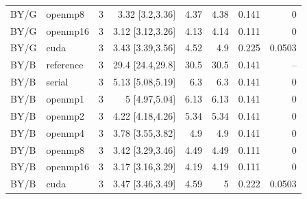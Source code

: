 \documentclass[11pt]{article}
\begin{document}
\begin{longtable}{llrrrrrr}
BY/G & openmp8 & 3 & 3.32 [3.2,3.36] & 4.37 & 4.38 & 0.141 & 0\\
BY/G & openmp16 & 3 & 3.12 [3.12,3.26] & 4.13 & 4.14 & 0.111 & 0\\
BY/G & cuda & 3 & 3.43 [3.39,3.56] & 4.52 & 4.9 & 0.225 & 0.0503\\
BY/B & reference & 3 & 29.4 [24.4,29.8] & 30.5 & 30.5 & 0.141 & --\\
BY/B & serial & 3 & 5.13 [5.08,5.19] & 6.3 & 6.3 & 0.141 & 0\\
BY/B & openmp1 & 3 & 5 [4.97,5.04] & 6.13 & 6.13 & 0.141 & 0\\
BY/B & openmp2 & 3 & 4.22 [4.18,4.26] & 5.34 & 5.34 & 0.141 & 0\\
BY/B & openmp4 & 3 & 3.78 [3.55,3.82] & 4.9 & 4.9 & 0.141 & 0\\
BY/B & openmp8 & 3 & 3.42 [3.29,3.46] & 4.49 & 4.49 & 0.111 & 0\\
BY/B & openmp16 & 3 & 3.17 [3.16,3.29] & 4.19 & 4.19 & 0.111 & 0\\
BY/B & cuda & 3 & 3.47 [3.46,3.49] & 4.59 & 5 & 0.222 & 0.0503\\
\bottomrule\end{longtable}\normalsize
\end{document}
